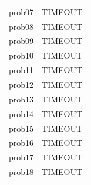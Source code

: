\begin{table}[H]
{\begin{tabular}{lrrr rr rr rr rrrrr}
            prob07           & \multicolumn{14}{c}{TIMEOUT}                                                                                                                                 \\
            prob08           & \multicolumn{14}{c}{TIMEOUT}                                                                                                                                 \\
            prob09           & \multicolumn{14}{c}{TIMEOUT}                                                                                                                                 \\
            prob10           & \multicolumn{14}{c}{TIMEOUT}                                                                                                                                 \\
            prob11           & \multicolumn{14}{c}{TIMEOUT}                                                                                                                                 \\
            prob12           & \multicolumn{14}{c}{TIMEOUT}                                                                                                                                 \\
            prob13           & \multicolumn{14}{c}{TIMEOUT}                                                                                                                                 \\
            prob14           & \multicolumn{14}{c}{TIMEOUT}                                                                                                                                 \\
            prob15           & \multicolumn{14}{c}{TIMEOUT}                                                                                                                                 \\
            prob16           & \multicolumn{14}{c}{TIMEOUT}                                                                                                                                 \\
            prob17           & \multicolumn{14}{c}{TIMEOUT}                                                                                                                                 \\
            prob18           & \multicolumn{14}{c}{TIMEOUT}                                                                                                                                 \\

\end{tabular}}
\end{table}
